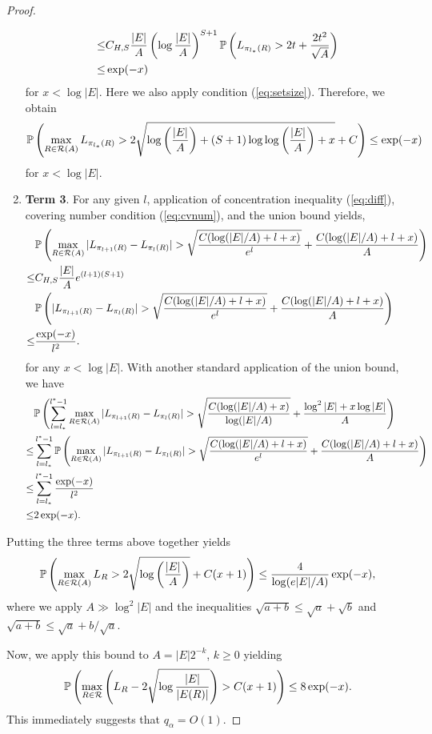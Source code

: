 \begin{proof}
\begin{enumerate}
\begin{align*}
\le & C_{H,S}\frac{|E|}{A}\left(\log \frac{|E|}{A}\right)^{S+1} \mathbb{P}\left(L_{\pi_{l_\ast}(R)}>2t+\frac{2t^2}{ \sqrt{A}}\right)\\
\le & \exp(-x) 
\end{align*}
for $x<\log |E|$. Here we also apply condition (\ref{eq:setsize}). Therefore, we obtain
$$
\mathbb{P}\left(\max_{R\in\mathcal{R}(A)}L_{\pi_{l_\ast}(R)}>2\sqrt{\log\left(\frac{|E|}{A}\right)+(S+1)\log\log\left(\frac{|E|}{ A}\right)+x}+C\right)\le \exp(-x) 
$$
for $x<\log |E|$.
\item[] \textbf{Term 3}. For any given $l$, application of concentration inequality (\ref{eq:diff}), covering number condition (\ref{eq:cvnum}), and the union bound yields,
\begin{align*}
&\PP\left(\max_{R\in\cR(A)}|L_{\pi_{l+1}(R)}-L_{\pi_{l}(R)}|>\sqrt{\frac{C(\log(|E|/A)+l+x)}{ e^l}}+\frac{C(\log(|E|/A)+l+x) }{ A }\right) \\
\le & C_{H,S}\frac{|E|}{ A}e^{(l+1)(S+1)} \\
&\PP\left(|L_{\pi_{l+1}(R)}-L_{\pi_{l}(R)}|>\sqrt{\frac{C(\log(|E|/A)+l+x)}{e^l}}+\frac{C(\log(|E|/A)+l+x)}{A}\right)\\
 \le & \frac{\exp(-x)}{l^2}.
\end{align*}
for any $x<\log |E|$. 
With another standard application of the union bound, we have
\begin{align*}
&\PP\left(\sum_{l=l_\ast}^{l^\ast-1}\max_{R\in\cR(A)}|L_{\pi_{l+1}(R)}-L_{\pi_{l}(R)}|>\sqrt{\frac{C(\log(|E|/A)+x) }{\log(|E|/A)}}+\frac{\log^2|E|+x\log|E|}{A}\right)  \\ 
\le & \sum_{l=l_\ast}^{l^\ast-1} \PP\left(\max_{R\in\cR(A)}|L_{\pi_{l+1}(R)}-L_{\pi_{l}(R)}|>\sqrt{\frac{C(\log(|E|/A)+l+x)}{e^l}}+\frac{C(\log(|E|/A)+l+x)}{A}\right)\\
\le & \sum_{l=l_\ast}^{l^\ast-1} \frac{\exp(-x)}{l^2}\\
\le & 2\exp(-x).
\end{align*}
\end{enumerate}
Putting the three terms above together yields
$$
\mathbb{P}\left(\max_{R\in\mathcal{R}(A)}L_R>2\sqrt{\log\left(\frac{|E|}{A}\right)}+C(x+1)\right)\le \frac{4}{\log(e|E|/A)}\exp(-x),
$$
where we apply $A\gg \log^2|E|$ and the inequalities $\sqrt{a+b}\le \sqrt{a}+\sqrt{b}$ and $\sqrt{a+b}\le \sqrt{a}+b/\sqrt{a}$.

Now, we apply this bound to $A=|E|2^{-k}$, $k\ge 0$ yielding 
$$
\mathbb{P}\left(\max_{R\in\mathcal{R}}\left(L_R-2\sqrt{\log\frac{|E|}{|E(R)|}}\right)>C(x+1)\right)\le 8\exp(-x).
$$
This immediately suggests that $q_\alpha=O(1)$.


\end{proof}
